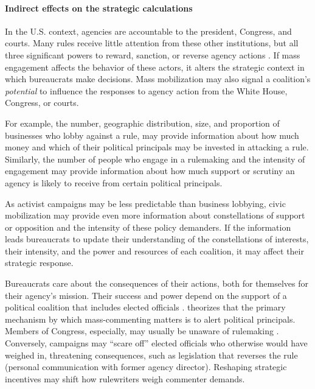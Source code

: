 \paragraph{Indirect effects on the strategic calculations}
In the U.S. context, agencies are accountable to the president, Congress, and courts. Many rules receive little attention from these other institutions, but all three significant powers to reward, sanction, or reverse agency actions \citep{Yaver2016}. If mass engagement affects the behavior of these actors, it alters the strategic context in which bureaucrats make decisions.
Mass mobilization may also signal a coalition's \textit{potential} to influence the responses to agency action from the White House, Congress, or courts. 

For example, the number, geographic distribution, size, and proportion of businesses who lobby against a rule, may provide information about how much money and which of their political principals may be invested in attacking a rule. Similarly, the number of people who engage in a rulemaking and the intensity of engagement may provide information about how much support or scrutiny an agency is likely to receive from certain political principals. 

As activist campaigns may be less predictable than business lobbying, civic mobilization may provide even more information about constellations of support or opposition and the intensity of these policy demanders. 
If the information leads bureaucrats to update their understanding of the constellations of interests, their intensity, and the power and resources of each coalition, it may affect their strategic response.

Bureaucrats care about the consequences of their actions, both for themselves for their agency’s mission. Their success and power depend on the support of a political coalition that includes elected officials \citep{Carpenter2001}. \citet{West2004} theorizes that the primary mechanism by which mass-commenting matters is to alert political principals. Members of Congress, especially, may usually be unaware of rulemaking \citep{Nou2016}. Conversely, campaigns may ``scare off'' elected officials who otherwise would have weighed in, threatening consequences, such as legislation that reverses the rule (personal communication with former agency director).
Reshaping strategic incentives may shift how rulewriters weigh commenter demands.

